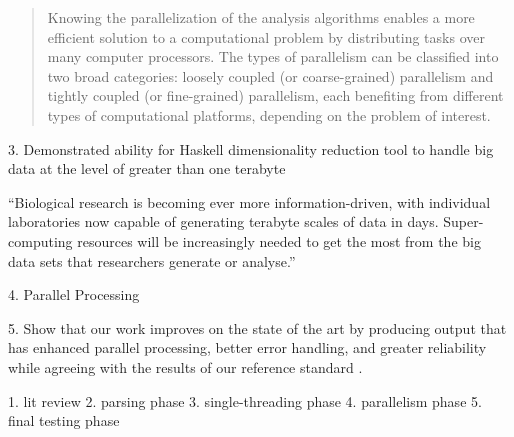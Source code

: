 \documentclass[11pt,letterpaper]{article}
\begin{document}
\begin{quote}
Knowing the parallelization of the analysis algorithms enables a more efficient solution to a computational problem by distributing tasks over many computer processors. The types of parallelism can be classified into two broad categories: loosely coupled (or coarse-grained) parallelism and tightly coupled (or fine-grained) parallelism, each benefiting from different types of computational platforms, depending on the problem of interest.  
\end{quote}

3. Demonstrated ability for Haskell dimensionality reduction tool to handle big data at the level of greater than one terabyte

``Biological research is becoming ever more information-driven, with individual laboratories now capable of generating terabyte scales of data in days. Super-computing resources will be increasingly needed to get the most from the big data sets that researchers generate or analyse.''

4. Parallel Processing

5. Show that our work improves on the state of the art by producing output that has enhanced parallel processing, better error handling, and greater reliability while agreeing with the results of our reference standard \cite{vieth2019systematic}.


1. lit review
2. parsing phase
3. single-threading phase
4. parallelism phase
5. final testing phase
\end{document}
